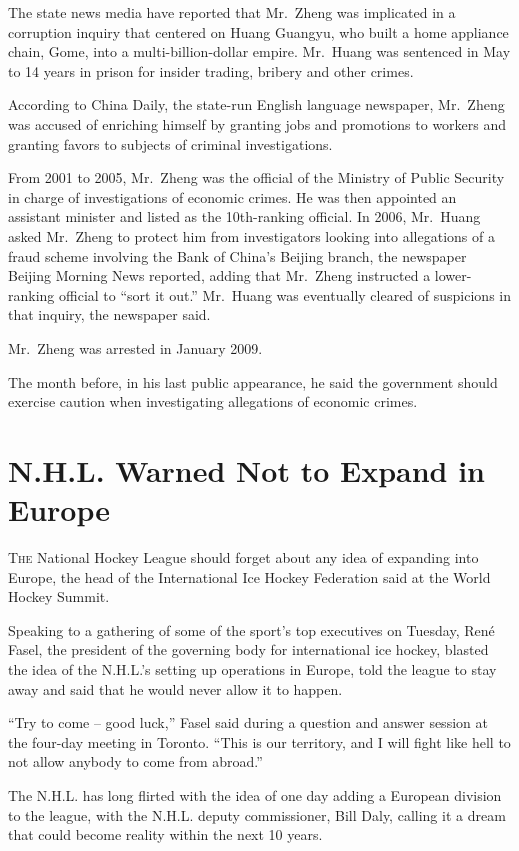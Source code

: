 ﻿\documentclass[12pt]{article}
\begin{document}
The state news media have reported that Mr.~Zheng was implicated in a corruption inquiry that
centered on Huang Guangyu, who built a home appliance chain, Gome, into a multi-billion-dollar
empire. Mr.~Huang was sentenced in May to 14 years in prison for insider trading, bribery and other
crimes.

According to China Daily, the state-run English language newspaper, Mr.~Zheng was accused of
enriching himself by granting jobs and promotions to workers and granting favors to subjects of
criminal investigations.

From 2001 to 2005, Mr.~Zheng was the official of the Ministry of Public Security in charge of
investigations of economic crimes. He was then appointed an assistant minister and listed as the
10th-ranking official. In 2006, Mr.~Huang asked Mr.~Zheng to protect him from investigators looking
into allegations of a fraud scheme involving the Bank of China's Beijing branch, the newspaper
Beijing Morning News reported, adding that Mr.~Zheng instructed a lower-ranking official to ``sort
it out.'' Mr.~Huang was eventually cleared of suspicions in that inquiry, the newspaper said.

Mr.~Zheng was arrested in January 2009.

The month before, in his last public appearance, he said the government should exercise caution when
investigating allegations of economic crimes.

\pagebreak
\section{N.H.L. Warned Not to Expand in Europe}

\lettrine{T}{he} National Hockey League should forget about any idea of
expanding into Europe, the head of the International Ice Hockey Federation said at the World Hockey
Summit.

Speaking to a gathering of some of the sport's top executives on Tuesday, Ren\'e Fasel, the
president of the governing body for international ice hockey, blasted the idea of the N.H.L.'s
setting up operations in Europe, told the league to stay away and said that he would never allow it
to happen.

``Try to come -- good luck,'' Fasel said during a question and answer session at the four-day
meeting in Toronto. ``This is our territory, and I will fight like hell to not allow anybody to come
from abroad.''

The N.H.L. has long flirted with the idea of one day adding a European division to the league, with
the N.H.L. deputy commissioner, Bill Daly, calling it a dream that could become reality within the
next 10 years.
\end{document}
